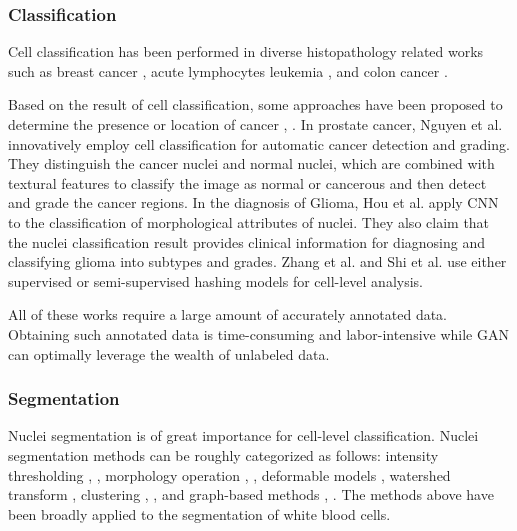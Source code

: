 \documentclass[journal]{IEEEtran}
\begin{document}
\subsubsection{Classification} 

Cell classification has been performed in diverse histopathology related works such as breast cancer \cite{Malon2013Classification}, acute lymphocytes leukemia \cite{Mohapatra2014An,Zhao2016Automatic}, and colon cancer \cite{Sirinukunwattana2016Locality}.

Based on the result of cell classification, some approaches have been proposed to determine the presence or location of cancer \cite{Nguyen2011Prostate}, \cite{hou2016automatic}. In prostate cancer, Nguyen et al. \cite{Nguyen2011Prostate} innovatively employ cell classification for automatic cancer detection and grading. They distinguish the cancer nuclei and normal nuclei, which are combined with textural features to classify the image as normal or cancerous and then detect and grade the cancer regions. In the diagnosis of Glioma, Hou et al. \cite{hou2016automatic} apply CNN to the classification of morphological attributes of nuclei. They also claim that the nuclei classification result provides clinical information for diagnosing and classifying glioma into subtypes and grades. {Zhang et al. \cite{zhang2015weighted, zhang2015towards, zhang2015high} and Shi et al. \cite{shi2017cell} use either supervised or semi-supervised hashing models for cell-level analysis.}

All of these works require a large amount of accurately annotated data. Obtaining such annotated data is time-consuming and labor-intensive while GAN can optimally leverage the wealth of unlabeled data. 

\subsubsection{Segmentation}
Nuclei segmentation is of great importance for cell-level classification. Nuclei segmentation methods can be roughly categorized as follows: intensity thresholding \cite{Callau2015Evaluation}, \cite{Wienert2012Detection}, morphology operation \cite{Dorini2013Semiautomatic}, \cite{Schmitt2009Morphological}, deformable models \cite{Dzyubachyk2010Advanced}, watershed transform \cite{Long2009A}, clustering \cite{Hai2014Automatic}, \cite{Bueno2012A}, and graph-based methods \cite{Chang2013Invariant}, \cite{Arslan2013Attributed}. The methods above have been broadly applied to the segmentation of white blood cells.
\end{document}
